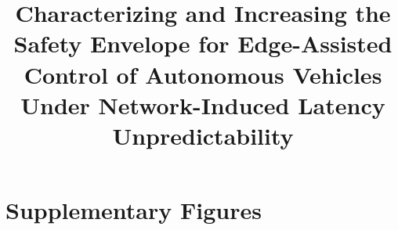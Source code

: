\documentclass[sigconf,9pt,review,anonymous,nonacm]{acmart}
\begin{document}

\title{Characterizing and Increasing the Safety Envelope for Edge-Assisted Control of Autonomous Vehicles Under Network-Induced Latency Unpredictability}


\maketitle










%



\appendix
\section{Supplementary Figures}
\label{sec:appendix}








\end{document}
